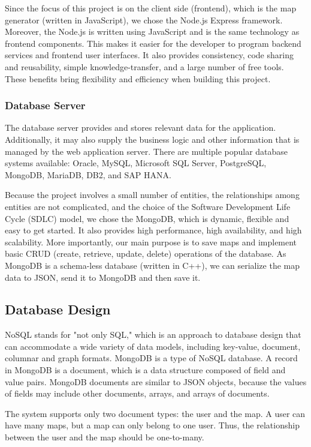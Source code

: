 Since the focus of this project is on the client side (frontend), which is the map generator (written in JavaScript), we chose the Node.js Express framework. Moreover, the Node.js is written using JavaScript and is the same technology as frontend components. This makes it easier for the developer to program backend services and frontend user interfaces. It also provides consistency, code sharing and reusability, simple knowledge-transfer, and a large number of free tools. These benefits bring flexibility and efficiency when building this project.

\subsubsection{Database Server}
\label{sec:Design>Architecture Design>Database Server}
The database server provides and stores relevant data for the application. Additionally, it may also supply the business logic and other information that is managed by the web application server. There are multiple popular database systems available: Oracle, MySQL, Microsoft SQL Server, PostgreSQL, MongoDB, MariaDB, DB2, and SAP HANA.

Because the project involves a small number of entities, the relationships among entities are not complicated, and the choice of the Software Development Life Cycle (SDLC) model, we chose the MongoDB, which is dynamic, flexible and easy to get started. It also provides high performance, high availability, and high scalability. More importantly, our main purpose is to save maps and implement basic CRUD (create, retrieve, update, delete) operations of the database. As MongoDB is a schema-less database (written in C++), we can serialize the map data to JSON, send it to MongoDB and then save it.

\subsection{Database Design}
\label{sec:Design>Database Design}
NoSQL stands for "not only SQL," which is an approach to database design that can accommodate a wide variety of data models, including key-value, document, columnar and graph formats. MongoDB is a type of NoSQL database. A record in MongoDB is a document, which is a data structure composed of field and value pairs. MongoDB documents are similar to JSON objects, because the values of fields may include other documents, arrays, and arrays of documents.

The system supports only two document types: the user and the map. A user can have many maps, but a map can only belong to one user. Thus, the relationship between the user and the map should be one-to-many.

